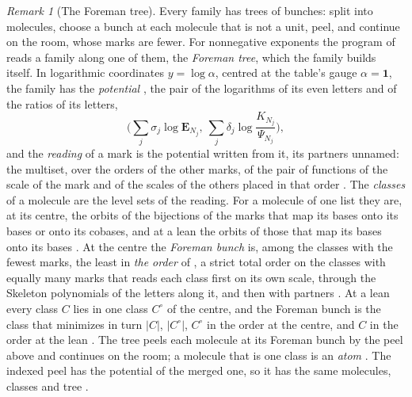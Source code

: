 \documentclass[11pt]{article}
\theoremstyle{plain}
\theoremstyle{definition}
\theoremstyle{remark}
\newtheorem{rem}[prop]{Remark}
\begin{document}
\begin{rem}[The Foreman tree]\label{rem:foreman}
Every family has trees of bunches: split into molecules, choose a bunch at each molecule that is not a unit, peel, and continue on the room, whose marks are fewer. For nonnegative exponents the program of \cite{F} reads a family along one of them, the \emph{Foreman tree}, which the family builds itself. In logarithmic coordinates $y=\log\alpha$, centred at the table's gauge $\alpha=\mathbf 1$, the family has the \emph{potential} \cite[Def.~8.17, p.~57]{F}, the pair of the logarithms of its even letters and of the ratios of its letters,
\[
\Big(\sum_j\sigma_j\log\mathbf E_{N_j},\ \sum_j\delta_j\log\frac{K_{N_j}}{\Psi_{N_j}}\Big),
\]
and the \emph{reading} of a mark is the potential written from it, its partners unnamed: the multiset, over the orders of the other marks, of the pair of functions of the scale of the mark and of the scales of the others placed in that order \cite[Def.~10.1, p.~64]{F}. The \emph{classes} of a molecule are the level sets of the reading. For a molecule of one list they are, at its centre, the orbits of the bijections of the marks that map its bases onto its bases or onto its cobases, and at a lean the orbits of those that map its bases onto its bases \cite[Cor.~11.17, p.~69]{F}. At the centre the \emph{Foreman bunch} is, among the classes with the fewest marks, the least in \emph{the order} of \cite[Def.~13.5, p.~78; Thm.~13.7, p.~79]{F}, a strict total order on the classes with equally many marks that reads each class first on its own scale, through the Skeleton polynomials of the letters along it, and then with partners \cite[Prop.~13.2, p.~77]{F}. At a lean every class $C$ lies in one class $C^\circ$ of the centre, and the Foreman bunch is the class that minimizes in turn $|C|$, $|C^\circ|$, $C^\circ$ in the order at the centre, and $C$ in the order at the lean \cite[Def.~13.6, p.~78]{F}. The tree peels each molecule at its Foreman bunch by the peel above and continues on the room; a molecule that is one class is an \emph{atom} \cite[Def.~14.4, p.~81]{F}. The indexed peel has the potential of the merged one, so it has the same molecules, classes and tree \cite[Prop.~14.21, p.~84]{F}.


\end{rem}
\end{document}
